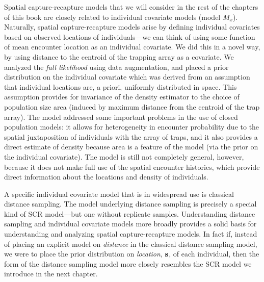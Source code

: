 Spatial capture-recapture models that we will consider in the rest of
the chapters of this book are closely related to
individual covariate models (model $M_{x}$). Naturally, spatial capture-recapture
models arise by defining individual covariates based on observed
locations of individuals---we can think of using some function of
mean encounter location as an individual covariate. We did this in a
novel way, by using distance to the centroid of the trapping array as
a covariate. We analyzed the {\it full likelihood} using data
augmentation, and placed a prior distribution on the individual
covariate which was derived from an assumption that individual
locations are, a priori, uniformly distributed in space. This
assumption provides for invariance of the density estimator to the
choice of population size area (induced by maximum distance from the
centroid of the trap array). The model addressed some important problems in the
use of closed population models: it allows for heterogeneity in
encounter probability due to the spatial juxtaposition of individuals
with the array of traps, and it 
also provides a direct estimate of density because area is a feature
of the model (via the prior on the individual covariate). The model is
still not completely general, however, because it does not make full use of
the spatial encounter histories, which provide direct
information about the locations and density of individuals.  

A specific individual covariate model that is in widespread use is
classical distance sampling. The model underlying distance
sampling is precisely a special kind of SCR model---but one without
replicate samples. Understanding distance sampling and individual
covariate models more broadly provides a solid basis for understanding
and analyzing spatial capture-recapture models. In fact if, instead of
placing an explicit model on {\it distance} in the classical distance
sampling model, we were to place the prior distribution on {\it
  location}, ${\bf s}$, of each individual, then the form of the
distance sampling model more closely resembles the SCR model we
introduce in the next chapter.



